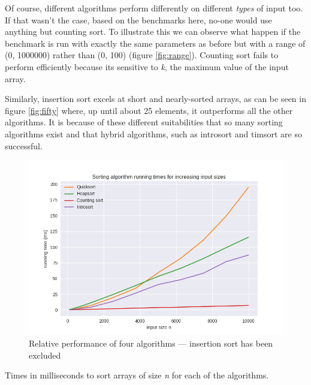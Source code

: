 \documentclass[12pt, a4paper]{article}
\begin{document}
Of course, different algorithms perform differently on different \emph{types} of input too. If that wasn't the case, based on the benchmarks here, no-one would use anything but counting sort. To illustrate this we can observe what happen if the benchmark is run with exactly the same parameters as before but with a range of (0, 1000000) rather than (0, 100) (figure \ref{fig:range}). Counting sort fails to perform efficiently because its sensitive to \emph{k}, the maximum value of the input array.

Similarly, insertion sort excels at short and nearly-sorted arrays, as can be seen in figure \ref{fig:fifty} where, up until about 25 elements, it outperforms all the other algorithms. It is because of these different suitabilities that so many sorting algorithms exist and that hybrid algorithms, such as introsort and timsort are so successful.

\begin{figure}
    \includegraphics[width=\linewidth]{../bm_output/plot_1_linear_20210513-101605.png}
    \caption{Relative performance of four algorithms — insertion sort has been excluded}
    \label{fig:linear4}
\end{figure}


\begin{table}[H]
    \resizebox{\textwidth}{!}{%
    
    }
\caption{Times in milliseconds to sort arrays of size \emph{n} for each of the algorithms.}
\label{table:results}
\end{table}
\end{document}
